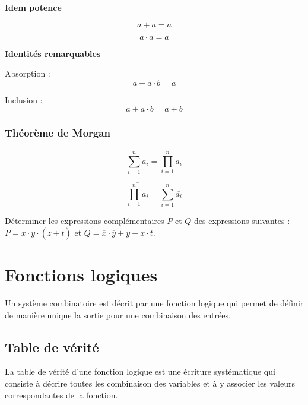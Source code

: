 \documentclass[10pt]{article}
\begin{document}
\begin{prop}
\textbf{Idem potence}

\begin{minipage}[c]{.45\linewidth}
$$ a + a = a$$
\end{minipage}\hfill
\begin{minipage}[c]{.45\linewidth}
$$ a\cdot a = a$$
\end{minipage}
\end{prop}


\begin{prop}
\textbf{Identités remarquables}

Absorption : 
$$ a + a\cdot b = a$$

Inclusion :
$$
a+\overline{a}\cdot b = a+b
$$
\end{prop}

\subsubsection{Théorème de Morgan}
\begin{theo}
$$
\overline{\sum\limits_{i=1}^{n} a_i} = \prod\limits_{i=1}^n \overline{a_i}
$$

$$
\overline{\prod\limits_{i=1}^{n} a_i} = \sum\limits_{i=1}^n \overline{a_i}
$$
\end{theo}

\begin{exemple}
Déterminer les expressions complémentaires $\overline{P}$ et $\overline{Q}$ des expressions suivantes : 
$P = x\cdot y \cdot (z + \overline{t})$ et $Q=\overline{x}\cdot\overline{y} + y + x\cdot t$.
\end{exemple}

\section{Fonctions logiques}

Un système combinatoire est décrit par une fonction logique qui permet de définir de manière unique la sortie pour une combinaison des entrées. 

\subsection{Table de vérité}
La table de vérité d'une fonction logique est une écriture systématique qui consiste à décrire toutes les combinaison des variables et à y associer les valeurs correspondantes de la fonction. 
\end{document}
